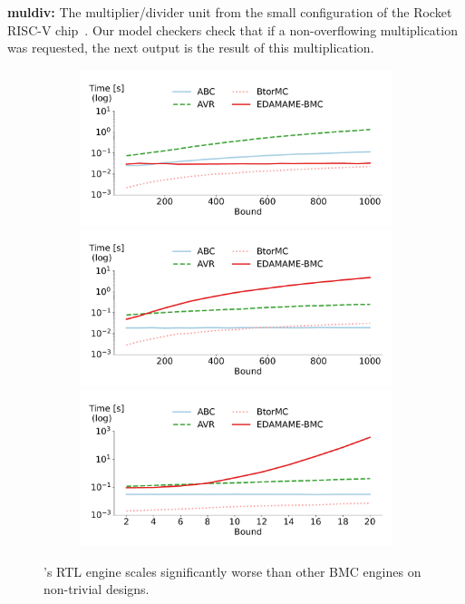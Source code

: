 \documentclass[acmsmall,screen,review]{acmart}
\begin{document}
\textbf{muldiv:} The multiplier/divider unit from the small configuration of the
Rocket RISC-V chip~\cite{ucb2016rocket}. Our model checkers check that if a non-overflowing multiplication was requested, the next output is the result of this multiplication.

\begin{figure}
  \centering
  \begin{subfigure}{\columnwidth}
  \includegraphics[width=\columnwidth]{bmc-plots/mitre.pdf}
  \label{fig:benchmark-lin-s}
  \includegraphics[width=\columnwidth]{bmc-plots/fsm.pdf}
  \label{fig:benchmark-lin-l}
  \includegraphics[width=\columnwidth]{bmc-plots/MulDiv.pdf}
  \label{fig:benchmark-err-s}
\end{subfigure}
  \caption{\toolname{}'s RTL engine scales significantly worse than other BMC engines on non-trivial designs.}\label{fig:benchmark-bmc}
\end{figure}  
\end{document}
